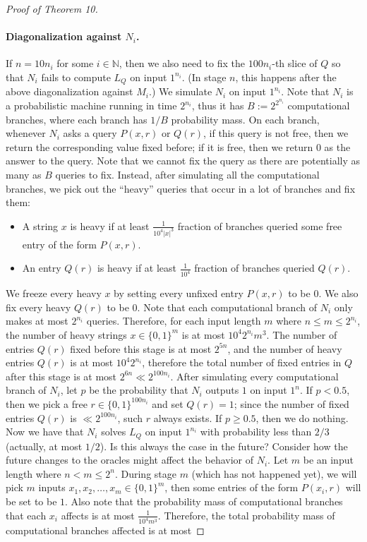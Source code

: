 \documentclass[10pt,a4paper]{article}
\begin{document}
\begin{proof}[Proof of Theorem 10]
\paragraph{Diagonalization against $N_i$.}
If $n=10n_i$ for some $i\in\mathbb N$, then we also need to fix the $100n_i$-th slice of $Q$ so that $N_i$ fails to compute $L_Q$ on input $1^{n_i}$. (In stage $n$, this happens after the above diagonalization against $M_i$.) We simulate $N_i$ on input $1^{n_i}$. Note that $N_i$ is a probabilistic machine running in time $2^{n_i}$, thus it has $B:=2^{2^{n_i}}$ computational branches, where each branch has $1/B$ probability mass. On each branch, whenever $N_i$ asks a query $P(x,r)$ or $Q(r)$, if this query is not free, then we return the corresponding value fixed before; if it is free, then we return $0$ as the answer to the query. Note that we cannot fix the query as there are potentially as many as $B$ queries to fix. Instead, after simulating all the computational branches, we pick out the ``heavy'' queries that occur in a lot of branches and fix them:
\begin{itemize}
\item A string $x$ is heavy if at least $\frac{1}{10^4|x|^3}$ fraction of branches queried some free entry of the form $P(x,r)$.
\item An entry $Q(r)$ is heavy if at least $\frac{1}{10^4}$ fraction of branches queried $Q(r)$.
\end{itemize}
We freeze every heavy $x$ by setting every unfixed entry $P(x,r)$ to be $0$. We also fix every heavy $Q(r)$ to be $0$. Note that each computational branch of $N_i$ only makes at most $2^{n_i}$ queries. Therefore, for each input length $m$ where $n\leq m\leq2^{n_i}$, the number of heavy strings $x\in\{0,1\}^m$ is at most $10^4 2^{n_i}m^3$. The number of entries $Q(r)$ fixed before this stage is at most $2^{5n}$, and the number of heavy entries $Q(r)$ is at most $10^4 2^{n_i}$, therefore the total number of fixed entries in $Q$ after this stage is at most $2^{6n}\ll2^{100n_i}$.
After simulating every computational branch of $N_i$, let $p$ be the probability that $N_i$ outputs $1$ on input $1^n$. If $p<0.5$, then we pick a free $r\in\{0,1\}^{100n_i}$ and set $Q(r)=1$; since the number of fixed entries $Q(r)$ is $\ll2^{100n_i}$, such $r$ always exists. If $p\geq0.5$, then we do nothing.
Now we have that $N_i$ solves $L_Q$ on input $1^{n_i}$ with probability less than $2/3$ (actually, at most $1/2$). Is this always the case in the future? Consider how the future changes to the oracles might affect the behavior of $N_i$. Let $m$ be an input length where $n<m\leq2^n$. During stage $m$ (which has not happened yet), we will pick $m$ inputs $x_1,x_2,\ldots,x_m\in\{0,1\}^m$, then some entries of the form $P(x_i,r)$ will be set to be $1$. Also note that the probability mass of computational branches that each $x_i$ affects is at most $\frac{1}{10^4m^3}$. Therefore, the total probability mass of computational branches affected is at most

\end{proof}
\end{document}
